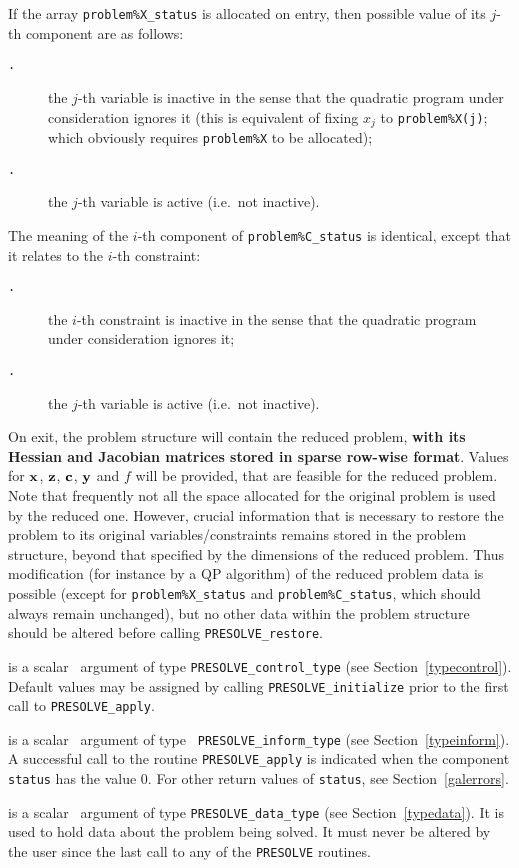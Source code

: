 \documentclass{galahad}
\newcommand{\packagename}{PRESOLVE}
\newcommand{\sym}{\tt\small}
\begin{document}
\begin{description}
\noindent
If the array {\tt problem\%X\_status} is allocated on entry, then possible
value of its $j$-th component are as follows:
\begin{description}
\item[\sym \galsyminactive.] the $j$-th variable is inactive in the sense that
the quadratic program under consideration ignores it (this is equivalent of
fixing $x_j$ to {\tt problem\%X(j)}; which obviously requires {\tt problem\%X}
to be allocated);
\item[\sym \galsymactive. ] the $j$-th variable is active (i.e.\ not
inactive).
\end{description}
The meaning of the $i$-th component of {\tt problem\%C\_status} is identical,
except that it relates to the $i$-th constraint:
\begin{description}
\item[\sym \galsyminactive.] the $i$-th constraint is inactive in the sense
that the quadratic program under consideration ignores it;
\item[\sym \galsymactive. ] the $j$-th variable is active (i.e.\ not
inactive).
\end{description}

\noindent
On exit, the problem structure will contain the reduced problem, {\bf with its
Hessian and Jacobian matrices stored in sparse row-wise format}.
Values for ${\mathbf{x}}$, ${\mathbf{z}}$, ${\mathbf{c}}$, ${\mathbf{y}}$ and $f$ will be provided, that are
feasible for the reduced problem. Note that frequently not
all the space allocated for the original problem is used by the
reduced one.  However, crucial information that is necessary to restore the
problem to its original variables/constraints remains stored in the problem
structure, beyond that specified by the dimensions of the reduced problem.
Thus modification (for instance by a QP algorithm) of the reduced problem data
is possible (except for {\tt problem\%X\_status} and {\tt problem\%C\_status},
which should always remain unchanged), but no other data within the problem
structure should be altered before calling {\tt \packagename\_restore}.

 is a scalar \intentinout\ argument of type
{\tt \packagename\_control\_type}
(see Section~\ref{typecontrol}). Default values may be assigned by calling
{\tt \packagename\_initialize} prior to the first call to
{\tt \packagename\_apply}.

 is a scalar \intentinout\ argument of type {\tt
\packagename\_inform\_type}
(see Section~\ref{typeinform}). A successful call to the routine
{\tt \packagename\_apply}
is indicated when the  component {\tt status} has the value 0.
For other return values of {\tt status}, see Section~\ref{galerrors}.

 is a scalar \intentinout\ argument of type
{\tt \packagename\_data\_type}
(see Section~\ref{typedata}). It is used to hold data about the problem being
solved. It must never be  altered by the user since the last call to
any of the {\tt \packagename} routines.

\end{description}
\end{document}
